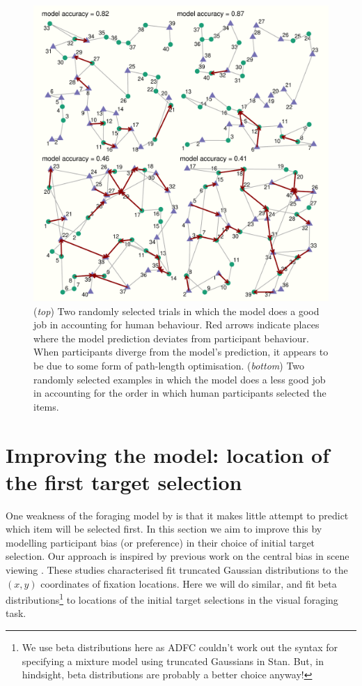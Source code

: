 \documentclass[vision,article,submit,pdftex,moreauthors]{Definitions/mdpi}
\begin{document}
\begin{figure}[H]
\centering
\includegraphics[width=12 cm]{Figures/qjep_ex_paths.pdf}
\caption{(\textit{top}) Two randomly selected trials in which the model does a good job in accounting for human behaviour. Red arrows indicate places where the model prediction deviates from participant behaviour. When participants diverge from the model's prediction, it appears to be due to some form of path-length optimisation. (\textit{bottom}) Two randomly selected examples in which the model does a less good job in accounting for the order in which human participants selected the items.}
\label{fig:qjep_paths}
\end{figure} 

\section{Improving the model: location of the first target selection}

One weakness of the foraging model by \cite{clarke2022foraging} is that it makes little attempt to predict which item will be selected first. In this section we aim to improve this by modelling participant bias (or preference) in their choice of initial target selection. Our approach is inspired by previous work on the central bias in scene viewing \cite{clarke_tatler2014, clarke2017}. These studies characterised fit truncated Gaussian distributions to the  $(x,y)$ coordinates of fixation locations. Here we will do similar, and fit beta distributions\footnote{We use beta distributions here as ADFC couldn't work out the syntax for specifying a mixture model using truncated Gaussians in Stan. But, in hindsight, beta distributions are probably a better choice anyway!} to locations of the initial target selections in the visual foraging task. 
\end{document}
